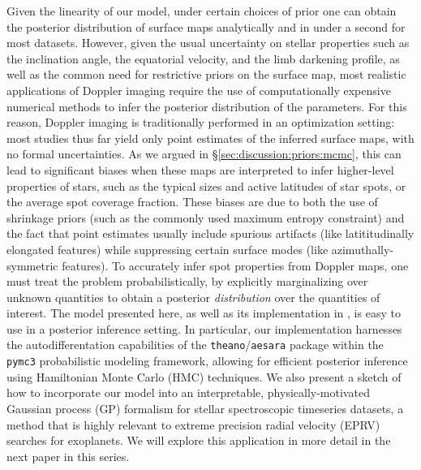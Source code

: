 \documentclass[modern]{aastex631}
\begin{document}
Given the linearity of our model, under certain choices of prior one can obtain the posterior distribution of surface maps analytically and in under a second for most datasets. 
However, given the usual uncertainty on stellar properties such as the inclination angle, the equatorial velocity, and the limb darkening profile, as well as the common need for restrictive priors on the surface map, most realistic applications of Doppler imaging require the use of computationally expensive numerical methods to infer the posterior distribution of the parameters.
For this reason, Doppler imaging is traditionally performed in an optimization setting: most studies thus far yield only point estimates of the inferred surface maps, with no formal uncertainties.
As we argued in \S\ref{sec:discussion:priors:mcmc}, this can lead to significant biases when these maps are interpreted to infer higher-level properties of stars, such as the typical sizes and active latitudes of star spots, or the average spot coverage fraction.
These biases are due to both the use of shrinkage priors (such as the commonly used maximum entropy constraint) and the fact that point estimates usually include spurious artifacts (like latititudinally elongated features) while suppressing certain surface modes (like azimuthally-symmetric features).
To accurately infer spot properties from Doppler maps, one must treat the problem probabilistically, by explicitly marginalizing over unknown quantities to obtain a posterior \emph{distribution} over the quantities of interest.
The model presented here, as well as its implementation in \starry, is easy to use in a posterior inference setting.
In particular, our implementation harnesses the autodifferentation capabilities of the \texttt{theano}/\texttt{aesara} \citep{Bergstra2010,Willard2021} package within the \texttt{pymc3} \citep{Salvatier2016} probabilistic modeling framework, allowing for efficient posterior inference using Hamiltonian Monte Carlo (HMC) techniques.
We also present a sketch of how to incorporate our model into an interpretable, physically-motivated Gaussian process (GP) formalism for stellar spectroscopic timeseries datasets, a method that is highly relevant to extreme precision radial velocity (EPRV) searches for exoplanets. We will explore this application in more detail in the next paper in this series.
\end{document}
